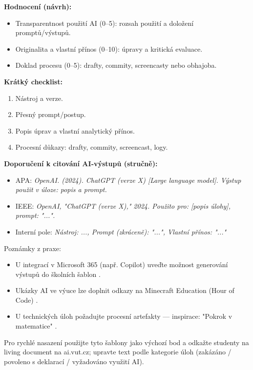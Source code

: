 \documentclass{report}%
\begin{document}
\bigskip

\textbf{Hodnocení (návrh):}
\begin{itemize}
  \item Transparentnost použití AI (0–5): rozsah použití a doložení promptů/výstupů.
  \item Originalita a vlastní přínos (0–10): úpravy a kritická evaluace.
  \item Doklad procesu (0–5): drafty, commity, screencasty nebo obhajoba.
\end{itemize}

\bigskip

\textbf{Krátký checklist:}
\begin{enumerate}
  \item Nástroj a verze.
  \item Přesný prompt/postup.
  \item Popis úprav a vlastní analytický přínos.
  \item Procesní důkazy: drafty, commity, screencast, logy.
\end{enumerate}

\bigskip

\textbf{Doporučení k citování AI‑výstupů (stručně):}
\begin{itemize}
  \item APA: \textit{OpenAI. (2024). ChatGPT (verze X) [Large language model]. Výstup použit v úloze: popis a prompt.}
  \item IEEE: \textit{OpenAI, "ChatGPT (verze X)," 2024. Použito pro: [popis úlohy], prompt: "...".}
  \item Interní pole: \textit{Nástroj: ..., Prompt (zkráceně): "...", Vlastní přínos: "..."}
\end{itemize}

\bigskip

Poznámky z praxe:
\begin{itemize}
  \item U integrací v Microsoft 365 (např. Copilot) uveďte možnost generování výstupů do školních šablon \cite{kb_ai_101_tipu_pdf_04e4a115_page_44_2}.
  \item Ukázky AI ve výuce lze doplnit odkazy na Minecraft Education (Hour of Code) \cite{kb_ai_101_tipu_pdf_04e4a115_page_15_2}.
  \item U technických úloh požadujte procesní artefakty — inspirace: "Pokrok v matematice" \cite{kb_ai_101_tipu_pdf_04e4a115_page_8_1}.
\end{itemize}

Pro rychlé nasazení použijte tyto šablony jako výchozí bod a odkažte studenty na living document na ai.vut.cz; upravte text podle kategorie úloh (zakázáno / povoleno s deklarací / vyžadováno využití AI).%
\end{document}
